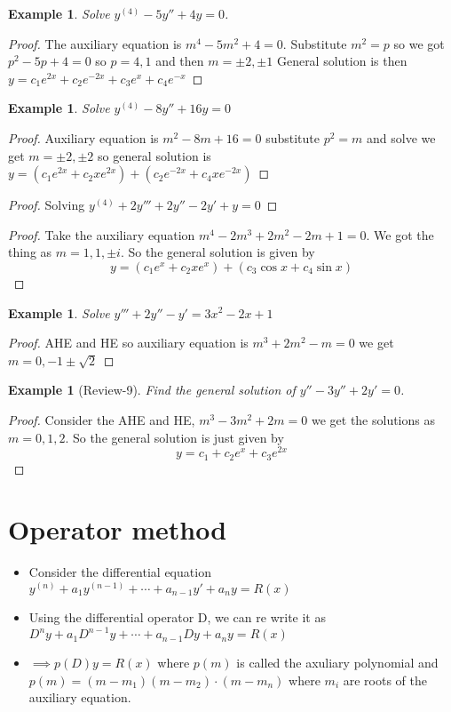 \documentclass[oneside,11pt,pdftex,final]{book}%
\numberwithin{equation}{section}
\newtheorem{example}[theorem]{Example}
\numberwithin{section}{chapter}
\numberwithin{equation}{chapter}
\begin{document}
\begin{example}
	Solve $ y^{(4)}-5y''+4y=0 $.
\end{example}
\begin{proof}
	The auxiliary equation is $ m^4-5m^2+4=0 $. Substitute $ m^2=p $ so we got $ p^2-5p+4=0 $ so $ p=4,1 $ and then $ m=\pm2,\pm1 $
	General solution is then $ y=c_1e^{2x}+c_2e^{-2x}+c_3 e^{x}+c_4e^{-x} $
\end{proof}

\begin{example}
	Solve $ y^{(4)}-8y''+16y=0 $
\end{example}
\begin{proof}
	Auxiliary equation is $ m^2-8m+16=0 $ substitute $ p^2=m $  and solve we get $ m=\pm2, \pm 2 $  so general solution is $ y=(c_1e^{2x}+c_2xe^{2x})+(c_2e^{-2x}+c_4xe^{-2x}) $
\end{proof}

\begin{proof}
	Solving $ y^{(4)}+2y'''+2y''-2y'+y=0 $
\end{proof}
\begin{proof}
	Take the auxiliary equation $ m^4-2m^3+2m^2-2m+1=0 $. We got the thing as $ m=1,1,\pm i $. So the general solution is given by 
	\[ y=(c_1e^{x}+c_2xe^{x})+(c_3 \cos x + c_4 \sin x)  \]
\end{proof}

\begin{example}
	Solve $ y'''+2y''-y'=3x^2-2x+1 $
\end{example}
\begin{proof}
	AHE and HE so auxiliary equation is $ m^3+2m^2-m=0 $ we get $ m=0,-1\pm \sqrt{2} $
\end{proof}

\begin{example}[Review-9]
	Find the general solution of $ y''-3y''+2y'=0 $.
\end{example}
\begin{proof}
	Consider the AHE and HE, $ m^3-3m^2+2m=0 $ we get the solutions as $ m=0,1,2 $. So the general solution is just given by
	\[ y=c_1+c_2e^{x}+c_3e^{2x} \]
\end{proof}

\section{Operator method}
\begin{itemize}
	\item Consider the differential equation $ y^{(n)}+a_1y^{(n-1)}+\cdots+a_{n-1}y'+a_ny=R(x) $
	\item Using the differential operator D, we can re write it as $ D^ny+a_1 D^{n-1}y+\cdots+a_{n-1}Dy+a_ny=R(x) $\\
	\item $ \implies p(D)y=R(x)$ where $ p(m) $ is called the axuliary polynomial and $ p(m)=(m-m_1)(m-m_2)\cdot(m-m_n) $ where $ m_i $ are roots of the auxiliary equation.
\end{itemize}
\end{document}
